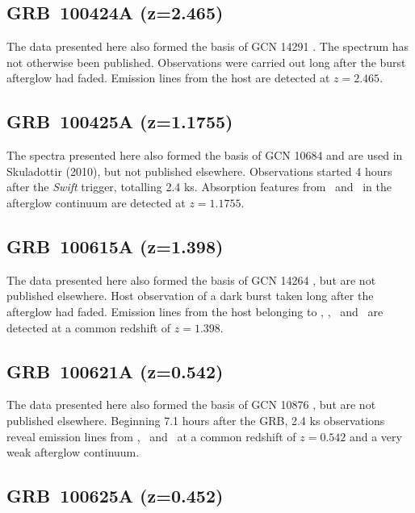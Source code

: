 \documentclass[longauth]{aa}    %
\begin{document}
\subsection{GRB~100424A (z=2.465)} \label{100424}

The data presented here also formed the basis of GCN 
14291 \citep{GCN14291}. The spectrum has
not otherwise been published. Observations were carried out long after the burst
afterglow had faded. Emission lines from the host are detected at $z=2.465$.

\subsection{GRB~100425A (z=1.1755)} \label{100425}

The spectra presented here also formed the basis of GCN 10684 \citep{GCN10684}
and are used in Skuladottir (2010), but not published elsewhere. Observations
started 4 hours after the \textit{Swift} trigger, totalling 2.4 ks. Absorption
features from \mgii~and \feii~in the afterglow continuum are detected at
$z=1.1755$.

\subsection{GRB~100615A (z=1.398)} \label{100615}

The data presented here also formed the basis of GCN 
14264 \citep{GCN14264}, but are not
published elsewhere. Host observation of a dark burst \citep{DElia2011} taken
long after the afterglow had faded. Emission lines from the host belonging to
\oii, \neiii, \oiii~and \ha~are detected at a common redshift of $z=1.398$.

\subsection{GRB~100621A (z=0.542)} \label{100621}

The data presented here also formed the basis of GCN 
10876 \citep{GCN10876}, but are not
published elsewhere. Beginning 7.1 hours after the GRB, 2.4 ks observations
reveal emission lines from \oii, \hb~and \oiii~at a common redshift of $z=0.542$
and a very weak afterglow continuum.

\subsection{GRB~100625A (z=0.452)} \label{100625}
\end{document}
